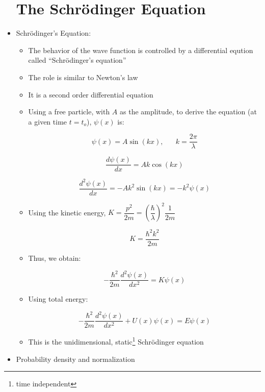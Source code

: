 \begin{itemize}

    \section{The Schr\"odinger Equation}

  \item Schr\"odinger's Equation:

    \begin{itemize}

      \item The behavior of the wave function is controlled by a differential eqution called ``Schr\"odinger's equation''

      \item The role is similar to Newton's  law

      \item It is a second order differential equation

      \item Using a free particle, with $A$ as the amplitude, to derive the equation (at a given time $t=t_o$), $\psi(x)$ is:

        $$\boxed{\psi(x)=A\sin(kx),\,\,\,\,\,\,\,\,\,\,k=\frac{2\pi}{\lambda}}$$

        $$\boxed{\frac{d\psi(x)}{dx}=Ak\cos(kx)}$$

        $$\boxed{\frac{d^2\psi(x)}{dx}=-Ak^2\sin(kx)=-k^2\psi(x)}$$

      \item Using the kinetic energy, $K=\dfrac{p^2}{2m}=\left( \dfrac{\hbar}{\lambda} \right)^2\dfrac{1}{2m}$

        $$K=\frac{\hbar^2k^2}{2m}$$

      \item Thus, we obtain:

        $$\boxed{-\frac{\hbar^2}{2m}\frac{d^2\psi(x)}{dx^2}=K\psi(x)}$$

      \item Using total energy:

        $$\boxed{-\frac{\hbar^2}{2m}\frac{d^2\psi(x)}{dx^2}+U(x)\psi(x)=E\psi(x)}$$

      \item This is the unidimensional, static\footnote{time independent} Schr\"odinger equation

    \end{itemize}

  \item Probability density and normalization


\end{itemize}

